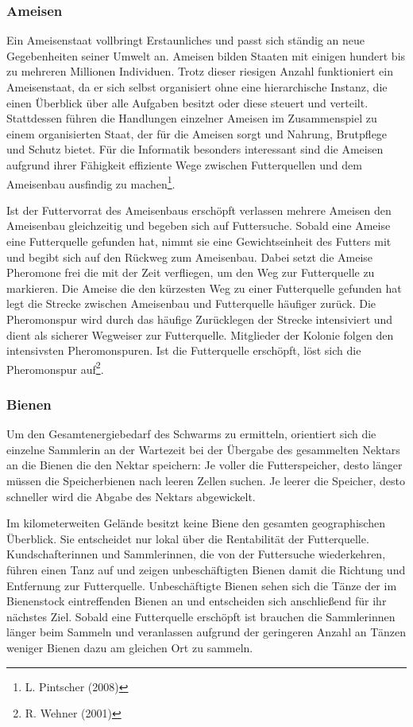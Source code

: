 \documentclass[a4paper, 11pt]{article}
\begin{document}
\subsubsection{Ameisen}
Ein Ameisenstaat vollbringt Erstaunliches und passt sich ständig an neue Gegebenheiten seiner Umwelt an. Ameisen bilden Staaten mit einigen hundert bis zu mehreren Millionen Individuen. Trotz dieser riesigen Anzahl funktioniert ein Ameisenstaat, da er sich selbst organisiert ohne eine hierarchische Instanz, die einen Überblick über alle Aufgaben besitzt oder diese steuert und verteilt. Stattdessen führen die Handlungen einzelner Ameisen im Zusammenspiel zu einem organisierten Staat, der für die Ameisen sorgt und Nahrung, Brutpflege und Schutz bietet. Für die Informatik besonders interessant sind die Ameisen aufgrund ihrer Fähigkeit effiziente Wege zwischen Futterquellen und dem Ameisenbau ausfindig zu machen\footnote{L. Pintscher (2008)}.
\par Ist der Futtervorrat des Ameisenbaus erschöpft verlassen mehrere Ameisen den Ameisenbau gleichzeitig und begeben sich auf Futtersuche. Sobald eine Ameise eine Futterquelle gefunden hat, nimmt sie eine Gewichtseinheit des Futters mit und begibt sich auf den Rückweg zum Ameisenbau. Dabei setzt die Ameise Pheromone frei die mit der Zeit verfliegen, um den Weg zur Futterquelle zu markieren. Die Ameise die den kürzesten Weg zu einer Futterquelle gefunden hat legt die Strecke zwischen Ameisenbau und Futterquelle häufiger zurück.  Die Pheromonspur wird durch das häufige Zurücklegen der Strecke intensiviert und dient als sicherer Wegweiser zur Futterquelle. Mitglieder der Kolonie folgen den intensivsten Pheromonspuren. Ist die Futterquelle erschöpft, löst sich die Pheromonspur auf\footnote{R. Wehner (2001)}.
\subsubsection{Bienen}
Um den Gesamtenergiebedarf des Schwarms zu ermitteln, orientiert sich die einzelne Sammlerin an der Wartezeit bei der Übergabe des gesammelten Nektars an die Bienen die den Nektar speichern: Je voller die Futterspeicher, desto länger müssen die Speicherbienen nach leeren Zellen suchen. Je leerer die Speicher, desto schneller wird die Abgabe des Nektars abgewickelt.
\par Im kilometerweiten Gelände besitzt keine Biene den gesamten geographischen Überblick. Sie entscheidet nur lokal über die Rentabilität der Futterquelle. Kundschafterinnen und Sammlerinnen, die von der Futtersuche wiederkehren, führen einen Tanz auf und zeigen unbeschäftigten Bienen damit die Richtung und Entfernung zur Futterquelle. Unbeschäftigte Bienen sehen sich die Tänze der im Bienenstock eintreffenden Bienen an und entscheiden sich anschließend für ihr nächstes Ziel. Sobald eine Futterquelle erschöpft ist brauchen die Sammlerinnen länger beim Sammeln und veranlassen aufgrund der geringeren Anzahl an Tänzen weniger Bienen dazu am gleichen Ort zu sammeln.
\newpage
\end{document}
